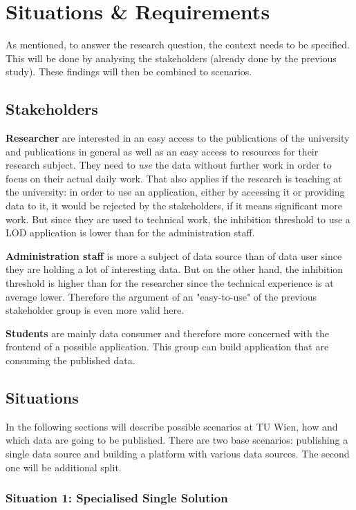 \section{Situations \& Requirements}

As mentioned, to answer the research question, the context needs to be specified. This will be done by analysing the stakeholders (already done by the previous study). These findings will then be combined to scenarios.

\subsection{Stakeholders}

\textbf{Researcher} are interested in an easy access to the publications of the university and publications in general as well as an easy access to resources for their research subject. They need to \emph{use} the data without further work in order to focus on their actual daily work. That also applies if the research is teaching at the university: in order to use an application, either by accessing it or providing data to it, it would be rejected by the stakeholders, if it means significant more work. But since they are used to technical work, the inhibition threshold to use a LOD application is lower than for the administration staff.

\textbf{Administration staff} is more a subject of data source than of data user since they are holding a lot of interesting data. But on the other hand, the 
inhibition threshold is higher than for the researcher since the technical experience is at average lower. Therefore the argument of an "easy-to-use" of the previous stakeholder group is even more valid here.

\textbf{Students} are mainly data consumer and therefore more concerned with the frontend of a possible application. This group can build application that are consuming the published data.

\subsection{Situations}

In the following sections will describe possible scenarios at TU Wien, how and which data are going to be published. There are two base scenarios: publishing a single data source and building a platform with various data sources. The second one will be additional split.

\subsubsection{Situation 1: Specialised Single Solution}

